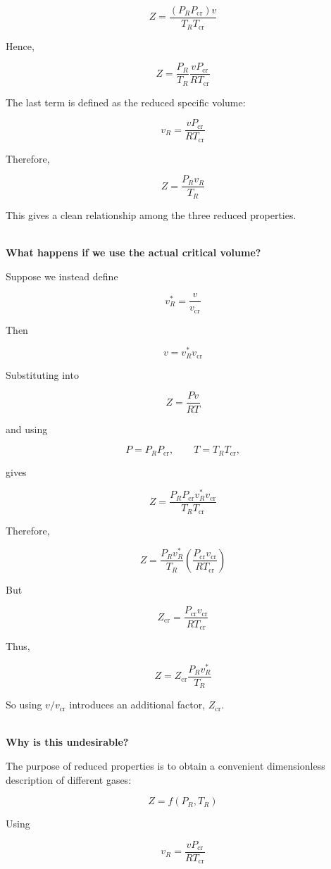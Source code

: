 \documentclass[12pt]{article}
\begin{document}
\[
Z=
\frac{(P_RP_{\mathrm{cr}})v}
{T_RT_{\mathrm{cr}}}
\]

Hence,

\[
Z=
\frac{P_R}{T_R}
\frac{vP_{\mathrm{cr}}}{RT_{\mathrm{cr}}}
\]

The last term is defined as the reduced specific volume:

\[
\boxed{
v_R=
\frac{vP_{\mathrm{cr}}}{RT_{\mathrm{cr}}}
}
\]

Therefore,

\[
\boxed{
Z=\frac{P_Rv_R}{T_R}
}
\]

This gives a clean relationship among the three reduced properties.

\textbf{\\ What happens if we use the actual critical volume?}

Suppose we instead define

\[
\boxed{
v_R^*=\frac{v}{v_{\mathrm{cr}}}
}
\]

Then

\[
v=v_R^*v_{\mathrm{cr}}
\]

Substituting into

\[
Z=\frac{Pv}{RT}
\]

and using

\[
P=P_RP_{\mathrm{cr}},
\qquad
T=T_RT_{\mathrm{cr}},
\]

gives

\[
Z=
\frac{P_RP_{\mathrm{cr}}v_R^*v_{\mathrm{cr}}}
{T_RT_{\mathrm{cr}}}
\]

Therefore,

\[
Z=
\frac{P_Rv_R^*}{T_R}
\left(
\frac{P_{\mathrm{cr}}v_{\mathrm{cr}}}
{RT_{\mathrm{cr}}}
\right)
\]

But

\[
\boxed{
Z_{\mathrm{cr}}
=
\frac{P_{\mathrm{cr}}v_{\mathrm{cr}}}
{RT_{\mathrm{cr}}}
}
\]

Thus,

\[
\boxed{
Z=
Z_{\mathrm{cr}}
\frac{P_Rv_R^*}{T_R}
}
\]

So using $v/v_{\mathrm{cr}}$ introduces an additional factor, $Z_{\mathrm{cr}}$.

\textbf{\\ Why is this undesirable?}

The purpose of reduced properties is to obtain a convenient dimensionless description of different gases:

\[
\boxed{
Z=f(P_R,T_R)
}
\]

Using

\[
\boxed{
v_R=\frac{vP_{\mathrm{cr}}}{RT_{\mathrm{cr}}}
}
\]
\end{document}
